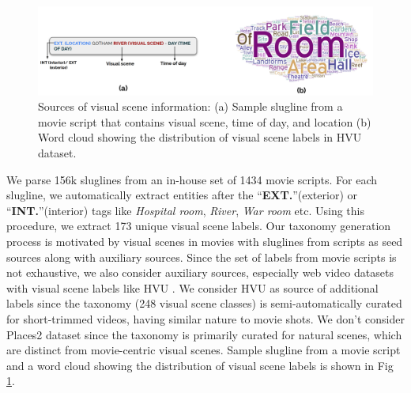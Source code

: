 \begin{figure}[!h]
 \centering
  \includegraphics[width=\linewidth]{figures/sources_of_information_visual_scene_taxonomy.png}
  \caption{Sources of visual scene information: (a) Sample slugline from a movie script that contains visual scene, time of day, and location (b) Word cloud showing the distribution of visual scene labels in HVU \cite{diba_large_2020} dataset.}
  \label{sources of information}
\end{figure}

We parse 156k sluglines from an in-house set of 1434 movie scripts. For each slugline, we automatically extract entities after the ``\textbf{EXT.}''(exterior) or ``\textbf{INT.}''(interior) tags like \textit{Hospital room}, \textit{River}, \textit{War room} etc.
Using this procedure, we extract 173 unique visual scene labels. Our taxonomy generation process is motivated by visual scenes in movies with sluglines from scripts as seed sources along with auxiliary sources.
Since the set of labels from movie scripts is not exhaustive, we also consider auxiliary sources, especially web video datasets with visual scene labels like HVU \cite{diba_large_2020}. We consider HVU as source of additional labels since the taxonomy (248 visual scene classes) is semi-automatically curated for short-trimmed videos, having similar nature to movie shots. We don’t consider Places2 \cite{zhou2017places} dataset since the taxonomy is primarily curated for natural
scenes, which are distinct from movie-centric visual scenes. Sample slugline from a movie script and a word cloud showing the distribution of visual scene labels is shown in Fig \ref{sources of information}.

